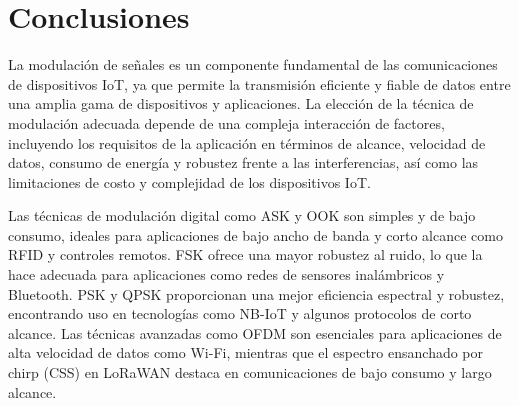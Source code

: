 \documentclass[12pt, letterpaper]{article}
\begin{document}
\vspace{1em}
\section{Conclusiones}
La modulación de señales es un componente fundamental de las comunicaciones de dispositivos IoT, ya que permite la transmisión eficiente y fiable de datos entre una amplia gama de dispositivos y aplicaciones. La elección de la técnica de modulación adecuada depende de una compleja interacción de factores, incluyendo los requisitos de la aplicación en términos de alcance, velocidad de datos, consumo de energía y robustez frente a las interferencias, así como las limitaciones de costo y complejidad de los dispositivos IoT.

Las técnicas de modulación digital como ASK y OOK son simples y de bajo consumo, ideales para aplicaciones de bajo ancho de banda y corto alcance como RFID y controles remotos. FSK ofrece una mayor robustez al ruido, lo que la hace adecuada para aplicaciones como redes de sensores inalámbricos y Bluetooth. PSK y QPSK proporcionan una mejor eficiencia espectral y robustez, encontrando uso en tecnologías como NB-IoT y algunos protocolos de corto alcance. Las técnicas avanzadas como OFDM son esenciales para aplicaciones de alta velocidad de datos como Wi-Fi, mientras que el espectro ensanchado por chirp (CSS) en LoRaWAN destaca en comunicaciones de bajo consumo y largo alcance.

\printbibliography[title={Bibliografía}]
\end{document}
